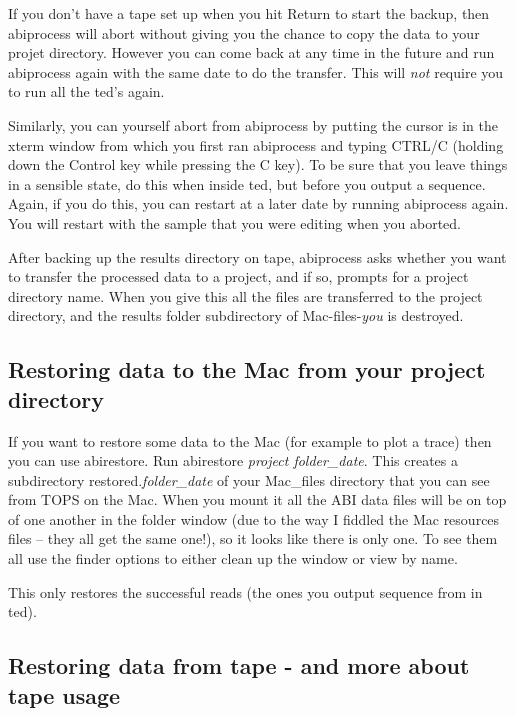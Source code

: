 If you don't have a tape set up when you hit Return to start the
backup, then {\sf abiprocess} will abort without giving you the chance
to copy the data to your projet directory.  However you can come back
at any time in the future and run {\sf abiprocess} again with the same
date to do the transfer.  This will {\em not} require you to run all
the {\sf ted}'s again.  

Similarly, you can yourself abort from {\sf abiprocess} by putting the
cursor is in the xterm window from which you first ran {\sf
abiprocess} and typing CTRL/C (holding down the Control key while
pressing the C key).  To be sure that you leave things in a sensible
state, do this when inside ted, but before you output a sequence.
Again, if you do this, you can restart at a later date by running {\sf
abiprocess} again.  You will restart with the sample that you were
editing when you aborted.

After backing up the results directory on tape, {\sf abiprocess} asks
whether you want to transfer the processed data to a project, and if
so, prompts for a project directory name.  When you give this all the
files are transferred to the project directory, and the results folder
subdirectory of {\sf Mac-files-{\em you}} is destroyed.  

\subsection{Restoring data to the Mac from your project directory}

If you want to restore some data to the Mac (for example to plot a
trace) then you can use {\sf abirestore}.  Run {\sf abirestore {\em
project folder\_date}}.  This creates a subdirectory {\sf
restored.{\em folder\_date}} of your {\sf Mac\_files} directory that
you can see from TOPS on the Mac.  When you mount it all the ABI data
files will be on top of one another in the folder window (due to the
way I fiddled the Mac resources files -- they all get the same one!),
so it looks like there is only one.  To see them all use the finder
options to either clean up the window or view by name.

This only restores the successful reads (the ones you output sequence
from in ted).  

\subsection{Restoring data from tape - and more about tape usage}

